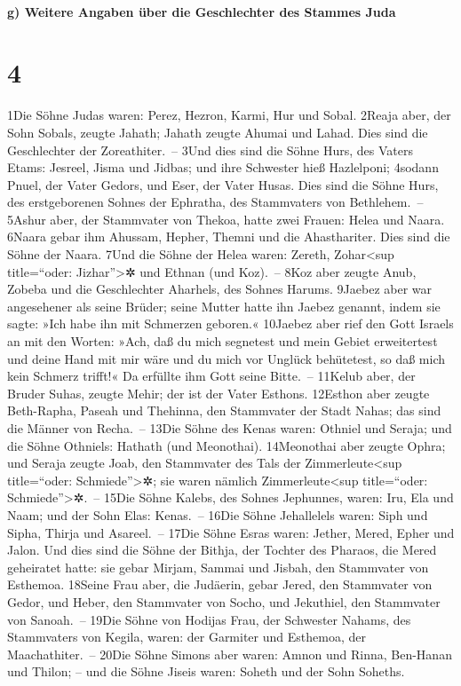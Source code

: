 \hypertarget{g-weitere-angaben-uxfcber-die-geschlechter-des-stammes-juda}{%
\paragraph{g) Weitere Angaben über die Geschlechter des Stammes
Juda}\label{g-weitere-angaben-uxfcber-die-geschlechter-des-stammes-juda}}

\hypertarget{section-3}{%
\section{4}\label{section-3}}

1Die Söhne Judas waren: Perez, Hezron, Karmi, Hur und Sobal. 2Reaja
aber, der Sohn Sobals, zeugte Jahath; Jahath zeugte Ahumai und Lahad.
Dies sind die Geschlechter der Zoreathiter.~-- 3Und dies sind die Söhne
Hurs, des Vaters Etams: Jesreel, Jisma und Jidbas; und ihre Schwester
hieß Hazlelponi; 4sodann Pnuel, der Vater Gedors, und Eser, der Vater
Husas. Dies sind die Söhne Hurs, des erstgeborenen Sohnes der Ephratha,
des Stammvaters von Bethlehem.~-- 5Ashur aber, der Stammvater von
Thekoa, hatte zwei Frauen: Helea und Naara. 6Naara gebar ihm Ahussam,
Hepher, Themni und die Ahasthariter. Dies sind die Söhne der Naara. 7Und
die Söhne der Helea waren: Zereth, Zohar\textless sup title=``oder:
Jizhar''\textgreater✲ und Ethnan (und Koz).~-- 8Koz aber zeugte Anub,
Zobeba und die Geschlechter Aharhels, des Sohnes Harums. 9Jaebez aber
war angesehener als seine Brüder; seine Mutter hatte ihn Jaebez genannt,
indem sie sagte: »Ich habe ihn mit Schmerzen geboren.« 10Jaebez aber
rief den Gott Israels an mit den Worten: »Ach, daß du mich segnetest und
mein Gebiet erweitertest und deine Hand mit mir wäre und du mich vor
Unglück behütetest, so daß mich kein Schmerz trifft!« Da erfüllte ihm
Gott seine Bitte.~-- 11Kelub aber, der Bruder Suhas, zeugte Mehir; der
ist der Vater Esthons. 12Esthon aber zeugte Beth-Rapha, Paseah und
Thehinna, den Stammvater der Stadt Nahas; das sind die Männer von
Recha.~-- 13Die Söhne des Kenas waren: Othniel und Seraja; und die Söhne
Othniels: Hathath (und Meonothai). 14Meonothai aber zeugte Ophra; und
Seraja zeugte Joab, den Stammvater des Tals der Zimmerleute\textless sup
title=``oder: Schmiede''\textgreater✲; sie waren nämlich
Zimmerleute\textless sup title=``oder: Schmiede''\textgreater✲.~-- 15Die
Söhne Kalebs, des Sohnes Jephunnes, waren: Iru, Ela und Naam; und der
Sohn Elas: Kenas.~-- 16Die Söhne Jehallelels waren: Siph und Sipha,
Thirja und Asareel.~-- 17Die Söhne Esras waren: Jether, Mered, Epher und
Jalon. Und dies sind die Söhne der Bithja, der Tochter des Pharaos, die
Mered geheiratet hatte: sie gebar Mirjam, Sammai und Jisbah, den
Stammvater von Esthemoa. 18Seine Frau aber, die Judäerin, gebar Jered,
den Stammvater von Gedor, und Heber, den Stammvater von Socho, und
Jekuthiel, den Stammvater von Sanoah.~-- 19Die Söhne von Hodijas Frau,
der Schwester Nahams, des Stammvaters von Kegila, waren: der Garmiter
und Esthemoa, der Maachathiter.~-- 20Die Söhne Simons aber waren: Amnon
und Rinna, Ben-Hanan und Thilon; -- und die Söhne Jiseis waren: Soheth
und der Sohn Soheths.

